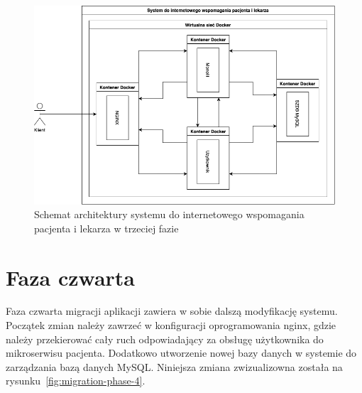 \documentclass[12pt,twoside]{book}
\newcommand{\captionvspace}{\vspace{6pt}}
\begin{document}
    \begin{figure}[ht]
        \centering
        \includegraphics[width=\textwidth]{includes/images/migration-phase-3.png}
        \captionvspace
        \caption{Schemat architektury systemu do internetowego wspomagania pacjenta i lekarza w trzeciej fazie}
        \label{fig:migration-phase-3}
    \end{figure}


    \section{Faza czwarta}
    Faza czwarta migracji aplikacji zawiera w sobie dalszą modyfikację systemu. Początek zmian należy zawrzeć w konfiguracji oprogramowania nginx, gdzie należy przekierować cały ruch odpowiadający za obsługę użytkownika do mikroserwisu pacjenta. Dodatkowo utworzenie nowej bazy danych w systemie do zarządzania bazą danych MySQL. Niniejsza zmiana zwizualizowna została na rysunku~\ref{fig:migration-phase-4}.
\end{document}
